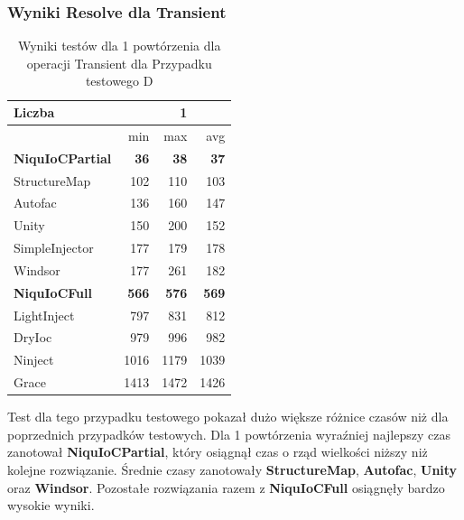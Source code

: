 \documentclass[12pt]{article}
\begin{document}
\subsubsection{Wyniki Resolve dla Transient}
\begin{table}[H]
\captionsetup{belowskip=0pt,aboveskip=0pt}
\begin{center}
\begin{small}
	\begin{tabular}{ | l | r r r | }
    		\hline
Liczba & & 1 & \\ \hline
 & min & max & avg \\ \hline
\textbf{NiquIoCPartial} & \textbf{36} & \textbf{38} & \textbf{37} \\ \hline
StructureMap & 102 & 110 & 103 \\ \hline
Autofac & 136 & 160 & 147 \\ \hline
Unity & 150 & 200 & 152 \\ \hline
SimpleInjector & 177 & 179 & 178 \\ \hline
Windsor & 177 & 261 & 182 \\ \hline
\textbf{NiquIoCFull} & \textbf{566} & \textbf{576} & \textbf{569} \\ \hline
LightInject & 797 & 831 & 812 \\ \hline
DryIoc & 979 & 996 & 982 \\ \hline
Ninject & 1016 & 1179 & 1039 \\ \hline
Grace & 1413 & 1472 & 1426 \\ \hline
  	\end{tabular}
\end{small}
\end{center}
\caption{Wyniki testów dla 1 powtórzenia dla operacji Transient dla Przypadku testowego D}
\label{TestCaseD_Transient1}
\end{table}
Test dla tego przypadku testowego pokazał dużo większe różnice czasów niż dla poprzednich przypadków testowych. Dla 1 powtórzenia wyraźniej najlepszy czas zanotował \textbf{NiquIoCPartial}, który osiągnął czas o rząd wielkości niższy niż kolejne rozwiązanie. Średnie czasy zanotowały \textbf{StructureMap}, \textbf{Autofac}, \textbf{Unity} oraz \textbf{Windsor}. Pozostałe rozwiązania razem z \textbf{NiquIoCFull} osiągnęły bardzo wysokie wyniki.
\\ \\
\end{document}
